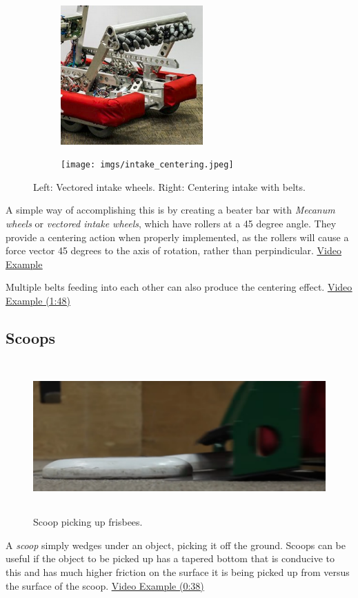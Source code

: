\documentclass[10pt,letterpaper]{book}
\begin{document}
\begin{figure}[H]
\begin{subfigure}[b]{.45\linewidth}
\includegraphics[height=2.1in]{imgs/intake_vectored.png}
\end{subfigure}\begin{subfigure}[b]{.45\linewidth}
\texttt{[image: imgs/intake\_centering.jpeg]}
\end{subfigure}
\caption{Left: Vectored intake wheels. Right: Centering intake with belts.}
\end{figure}


\begin{asparaitem}[a)]
\item A simple way of accomplishing this is by creating a beater bar with \textit{Mecanum wheels} or \textit{vectored intake wheels}, which have rollers at a 45 degree angle. They provide a centering action when properly implemented, as the rollers will cause a force vector 45 degrees to the axis of rotation, rather than perpindicular. \href{https://www.youtube.com/watch?v=WwxNSiHXREo}{\color{red}\underline{Video Example}}
\item Multiple belts feeding into each other can also produce the centering effect. \href{https://youtu.be/p0_YOm5fjC8?t=107}{\color{red}\underline{Video Example (1:48)}}
\end{asparaitem}

\subsection{Scoops}
\begin{figure}[H]
	\includegraphics[height=2.3in]{imgs/scoop.png}
	\caption{Scoop picking up frisbees.}
\end{figure}
A \textit{scoop} simply wedges under an object, picking it off the ground. Scoops can be useful if the object to be picked up has a tapered bottom that is conducive to this and has much higher friction on the surface it is being picked up from versus the surface of the scoop. \href{https://youtu.be/uKy-IKDq_6o?t=38}{\color{red}\underline{Video Example (0:38)}}
\end{document}
